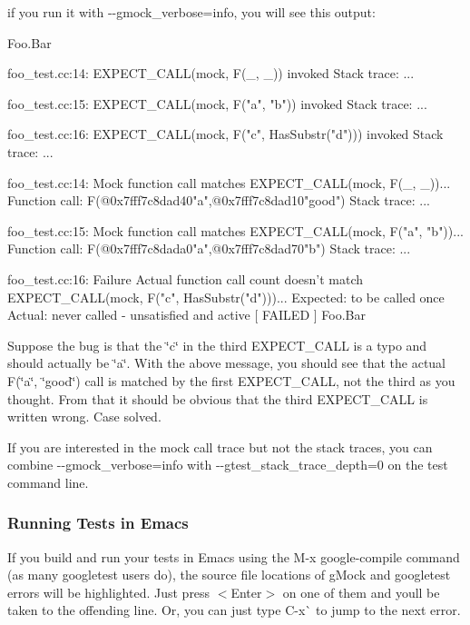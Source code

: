 if you run it with {\ttfamily -\/-\/gmock\+\_\+verbose=info}, you will see this output\+:


\begin{DoxyCode}
[ RUN       ] Foo.Bar

foo\_test.cc:14: EXPECT\_CALL(mock, F(\_, \_)) invoked
Stack trace: ...

foo\_test.cc:15: EXPECT\_CALL(mock, F("a", "b")) invoked
Stack trace: ...

foo\_test.cc:16: EXPECT\_CALL(mock, F("c", HasSubstr("d"))) invoked
Stack trace: ...

foo\_test.cc:14: Mock function call matches EXPECT\_CALL(mock, F(\_, \_))...
    Function call: F(@0x7fff7c8dad40"a",@0x7fff7c8dad10"good")
Stack trace: ...

foo\_test.cc:15: Mock function call matches EXPECT\_CALL(mock, F("a", "b"))...
    Function call: F(@0x7fff7c8dada0"a",@0x7fff7c8dad70"b")
Stack trace: ...

foo\_test.cc:16: Failure
Actual function call count doesn't match EXPECT\_CALL(mock, F("c", HasSubstr("d")))...
         Expected: to be called once
           Actual: never called - unsatisfied and active
[  FAILED  ] Foo.Bar
\end{DoxyCode}


Suppose the bug is that the {\ttfamily \char`\"{}c\char`\"{}} in the third {\ttfamily E\+X\+P\+E\+C\+T\+\_\+\+C\+A\+LL} is a typo and should actually be {\ttfamily \char`\"{}a\char`\"{}}. With the above message, you should see that the actual {\ttfamily F(\char`\"{}a\char`\"{}, \char`\"{}good\char`\"{})} call is matched by the first {\ttfamily E\+X\+P\+E\+C\+T\+\_\+\+C\+A\+LL}, not the third as you thought. From that it should be obvious that the third {\ttfamily E\+X\+P\+E\+C\+T\+\_\+\+C\+A\+LL} is written wrong. Case solved.

If you are interested in the mock call trace but not the stack traces, you can combine {\ttfamily -\/-\/gmock\+\_\+verbose=info} with {\ttfamily -\/-\/gtest\+\_\+stack\+\_\+trace\+\_\+depth=0} on the test command line.

\subsubsection*{Running Tests in Emacs}

If you build and run your tests in Emacs using the {\ttfamily M-\/x google-\/compile} command (as many googletest users do), the source file locations of g\+Mock and googletest errors will be highlighted. Just press {\ttfamily $<$Enter$>$} on one of them and you\textquotesingle{}ll be taken to the offending line. Or, you can just type {\ttfamily C-\/x}\`{} to jump to the next error.

